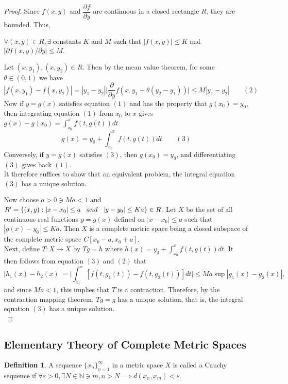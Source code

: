 \documentclass[11pt,a4paper]{article}
\theoremstyle{definition}
\newtheorem{defn}[thm]{Definition}
\begin{document}
\begin{proof}
Since $f(x,y)$ and $\dfrac{\partial f}{\partial y}$ are continuous in a closed rectangle $R$, they are bounded. Thus,

$\forall (x,y)\in R,\exists$ constants $K$ and $M$ such that $|f(x,y)|\leq K$ and $|\partial f(x,y)/\partial y|\leq M$.

Let $(x,y_1), (x,y_2)\in R$. Then by the mean value theorem, for some $\theta \in (0,1)$ we have $$|f(x,y_1)-f(x,y_2)|=|y_1-y_2|\Big|\frac{\partial}{\partial y}f(x,y_1+\theta (y_2-y_1))\Big|\leq M|y_1-y_2|\qquad (2)$$ Now if $y=g(x)$ satisfies equation $(1)$ and has the property that $g(x_0)=y_0$, then integrating equation $(1)$ from $x_0$ to $x$ gives \hspace{0.3cm}$\displaystyle{g(x)-g(x_0)=\int^x_{x_0}f(t,g(t))dt}$ $$g(x)=y_0+\int^x_{x_0}f(t,g(t))dt\qquad (3)$$ 
Conversely, if $y=g(x)$ satisfies $(3)$, then $g(x_0)=y_0$, and differentiating $(3)$ gives back $(1)$.\\It therefore suffices to show that an equivalent problem, the integral equation $(3)$ has a unique solution.

Now choose $a>0\ni Ma<1$ and $R'=\{(x,y):|x-x_0|\leq a\hspace{0.3cm} and\hspace{0.3cm} |y-y_0|\leq Ka\}\in R$. 
Let $X$ be the set of all continuous real functions $y=g(x)$ defined on $|x-x_0|\leq a$ such that $|g(x)-y_0|\leq Ka$. Then $X$ is a complete metric space being a closed subspace of the complete metric space $C[x_0-a,x_0+a]$.\\ Next, define $T:X\rightarrow X$ by $Tg=h$ where \hspace{0.3cm}$\displaystyle{h(x)=y_0+\int^x_{x_0}f(t,g(t))dt}.$ It then follows from equation $(3)$ and $(2)$ that $$\Big|h_1(x)-h_2(x)\Big|=\Bigg|\int^x_{x_0}[f(t,g_1(t))-f(t,g_2(t))]dt\Bigg|\leq Ma\sup |g_1(x)-g_2(x)|,$$ and since $Ma<1$, this implies that $T$ is a contraction. Therefore, by the contraction mapping theorem, $Tg=g$ has a unique solution, that is, the integral equation $(3)$ has a unique solution.\\
\end{proof}


\pagebreak
\subsection{Elementary Theory of Complete Metric Spaces}


\begin{defn}
A sequence $\{x_n\}^{\infty}_{n=1}$ in a metric space $X$ is called a Cauchy sequence if $\forall \varepsilon>0, \exists N\in \mathbb{N}\ni m,n>N\implies d(x_n,x_m)<\varepsilon$.

\end{defn}
\end{document}
